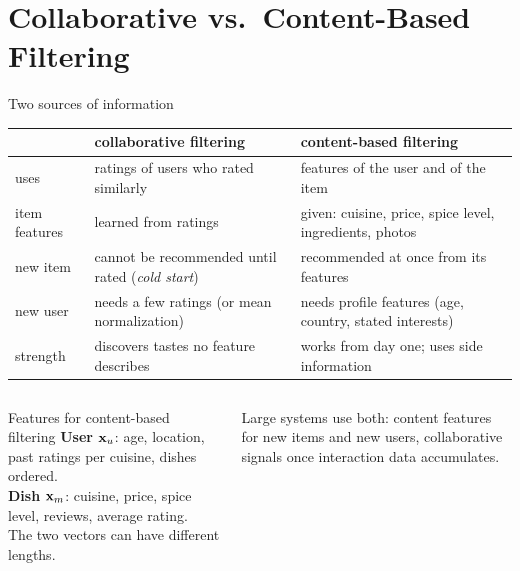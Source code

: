 \documentclass[aspectratio=169,10pt]{beamer}
\begin{document}
\section{Collaborative vs.\ Content-Based Filtering}

\begin{frame}{Two sources of information}
  \footnotesize
  \renewcommand{\arraystretch}{1.3}
  \begin{tabular}{@{}L{2.8cm}L{5.2cm}L{5.2cm}@{}}
    \toprule
    & \textbf{collaborative filtering} & \textbf{content-based filtering}\\
    \midrule
    uses & ratings of users who rated similarly & features of the user and of the item\\
    item features & learned from ratings & given: cuisine, price, spice level, ingredients, photos\\
    new item & cannot be recommended until rated (\emph{cold start}) & recommended at once from its features\\
    new user & needs a few ratings (or mean normalization) & needs profile features (age, country, stated interests)\\
    strength & discovers tastes no feature describes & works from day one; uses side information\\
    \bottomrule
  \end{tabular}
  \vspace{3mm}
  \begin{columns}[T,onlytextwidth]
    \begin{column}{0.5\textwidth}
      \begin{block}{Features for content-based filtering}
        \textbf{User} $\mathbf{x}_u$: age, location, past ratings per cuisine, dishes ordered.\\
        \textbf{Dish} $\mathbf{x}_m$: cuisine, price, spice level, reviews, average rating.\\
        The two vectors can have different lengths.
      \end{block}
    \end{column}
    \begin{column}{0.46\textwidth}
      \begin{keyidea}
        Large systems use both: content features for new items and new users,
        collaborative signals once interaction data accumulates.
      \end{keyidea}
    \end{column}
  \end{columns}
\end{frame}
\end{document}
